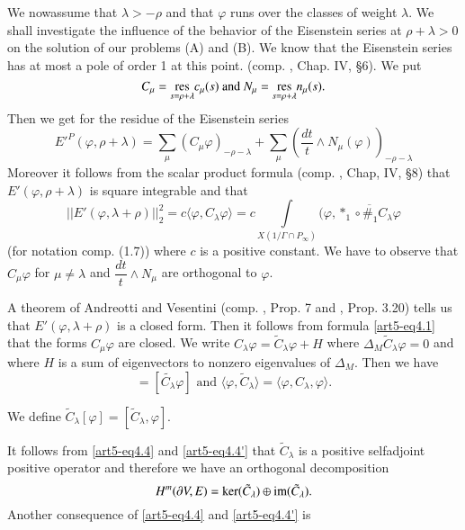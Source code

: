 We now\pageoriginale assume that $\lambda > -\rho$ and that $\varphi$ runs over the classes of weight $\lambda$. We shall investigate the influence of the behavior of the Eisenstein series at $\rho + \lambda > 0$ on the solution of our problems (A) and (B). We know that the Eisenstein series has at most a pole of order 1 at this point. (comp. \cite{art5-key8}, Chap. IV, \S 6). We put
$$ 
C_\mu = {\displaystyle{\mathop{\operatorname{res}}_{s=\rho + \lambda}}} c_\mu (s) \text{ and } N_\mu = {\displaystyle{\mathop{\operatorname{res}}_{s = \rho + \lambda}}} n_\mu (s).
$$
Then we get for the residue of the Eisenstein series
$$
E'^P (\varphi, \rho + \lambda) = \sum\limits_\mu (C_\mu \varphi)_{ - \rho - \lambda} + \sum\limits_\mu \left(\frac{dt}{t} \wedge N_\mu (\varphi) \right)_{ - \rho - \lambda}
$$
Moreover it follows from the scalar product formula (comp. \cite{art5-key8}, Chap, IV, \S 8) that $E' (\varphi,\rho + \lambda)$ is square integrable and that 
\begin{equation}
|| E' (\varphi,\lambda + \rho) ||^2_2 = c \langle\varphi,C_\lambda \varphi \rangle  = c \int\limits_{X (1 / \Gamma \cap P_\infty)}  (\varphi, \overline{\ast_1 \circ \#_1 C_\lambda \varphi} \label{art5-eq4.4}
\end{equation}
(for notation comp. (1.7)) where $c$ is a positive constant. We have to observe that $C_{\mu} \varphi$ for $\mu \neq \lambda$ and $\dfrac{dt}{t} \wedge N_\mu$ are orthogonal to $\varphi$.

A theorem of Andreotti and Vesentini  (comp. \cite{art5-key1}, Prop. 7 and \cite{art5-key5}, Prop. 3.20) tells us that $E'(\varphi, \lambda + \rho)$ is a closed form. Then it follows from formula \eqref{art5-eq4.1} that the forms $C_\mu \varphi$ are closed. We write $C_\lambda \varphi = \tilde{C}_\lambda \varphi + H$ where $\Delta_M \tilde{C}_\lambda \varphi = 0$ and where $H$ is a sum of eigenvectors to nonzero eigenvalues of $\Delta_M$. Then we have
\begin{equation*}
[C_\lambda \varphi] = [\tilde{C_\lambda} \varphi] \text{ and } \langle \varphi, \tilde{C}_\lambda\rangle  = \langle \varphi, C_\lambda, \varphi\rangle. 
\tag{$4.4'$}\label{art5-eq4.4'}
\end{equation*}

We define $\tilde{C}_\lambda [\varphi] = [\tilde{C}_\lambda, \varphi]$.

It follows from \eqref{art5-eq4.4} and \eqref{art5-eq4.4'} that $\tilde{C}_\lambda$ is a positive selfadjoint positive operator and therefore we have an orthogonal decomposition
$$
H^m (\partial V, E) = \ker (\tilde{C}_\lambda) \oplus \operatorname{im} (\tilde{C}_\lambda).
$$
Another consequence of \eqref{art5-eq4.4} and \eqref{art5-eq4.4'} is 

